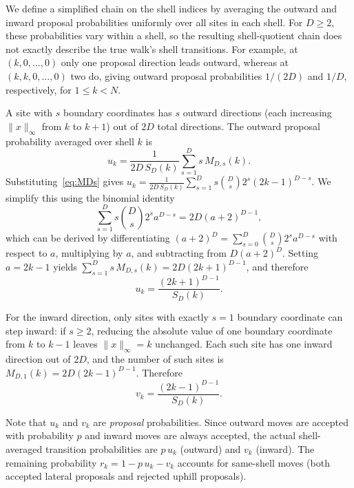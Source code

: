 \documentclass[conference]{IEEEtran}
\newcommand{\norm}[1]{\lVert #1\rVert}
\begin{document}
We define a simplified chain on the shell indices by averaging
the outward and inward proposal probabilities uniformly over
all sites in each shell. For $D\ge2$, these probabilities vary
within a shell, so the resulting shell-quotient chain does not
exactly describe the true walk's shell transitions. For example,
at $(k,0,\ldots,0)$ only one proposal direction leads outward,
whereas at $(k,k,0,\ldots,0)$ two do, giving outward proposal
probabilities $1/(2D)$ and $1/D$, respectively, for $1\le k<N$.

A site with $s$ boundary coordinates has $s$ outward directions (each
increasing $\norm{x}_\infty$ from $k$ to $k+1$) out of $2D$ total
directions.
The outward proposal probability averaged over shell $k$ is
\begin{equation}
\label{eq:uk-sum}
u_k = \frac{1}{2D\,S_D(k)} \sum_{s=1}^{D} s\,M_{D,s}(k).
\end{equation}
Substituting~\eqref{eq:MDs} gives
$u_k = \frac{1}{2D\,S_D(k)} \sum_{s=1}^{D} s\binom{D}{s}2^s(2k-1)^{D-s}$.
We simplify this using the binomial identity
\begin{equation}
\label{eq:binomial-identity}
\sum_{s=1}^{D} s\binom{D}{s}2^s a^{D-s} = 2D(a+2)^{D-1},
\end{equation}
which can be derived by differentiating $(a+2)^D = \sum_{s=0}^{D}
\binom{D}{s}2^s a^{D-s}$ with respect to $a$, multiplying by $a$,
and subtracting from $D(a+2)^D$.
Setting $a = 2k-1$ yields $\sum_{s=1}^{D} s\,M_{D,s}(k) = 2D(2k+1)^{D-1}$,
and therefore
\begin{equation}
\label{eq:uk}
\boxed{u_k = \frac{(2k+1)^{D-1}}{S_D(k)}.}
\end{equation}

For the inward direction, only sites with exactly $s=1$ boundary coordinate
can step inward: if $s \ge 2$, reducing the absolute value of one boundary coordinate from $k$ to $k-1$ leaves $\norm{x}_\infty = k$ unchanged.
Each such site has one inward direction out of $2D$, and the number of
such sites is $M_{D,1}(k) = 2D(2k-1)^{D-1}$.
Therefore
\begin{equation}
\label{eq:vk}
\boxed{v_k = \frac{(2k-1)^{D-1}}{S_D(k)}.}
\end{equation}

Note that $u_k$ and $v_k$ are \emph{proposal} probabilities.
Since outward moves are accepted with probability $p$ and inward moves
are always accepted, the actual shell-averaged transition probabilities
are $p\,u_k$ (outward) and $v_k$ (inward).
The remaining probability $r_k = 1 - p\,u_k - v_k$ accounts for
same-shell moves (both accepted lateral proposals and rejected uphill
proposals).
\end{document}
